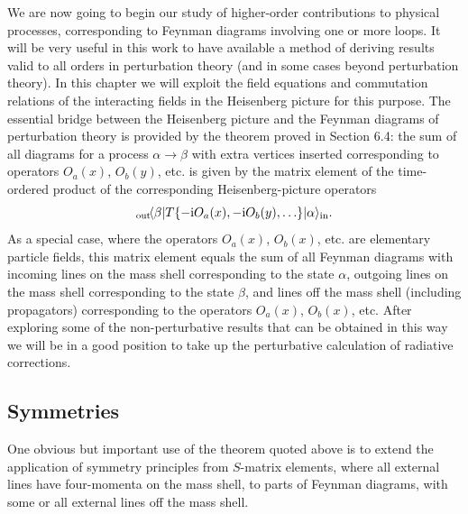 
We are now going to begin our study of higher-order contributions to
physical processes, corresponding to Feynman diagrams involving one or
more loops. It will be very useful in this work to have available a method
of deriving results valid to all orders in perturbation theory (and in some
cases beyond perturbation theory). In this chapter we will exploit the
field equations and commutation relations of the interacting fields in the
Heisenberg picture for this purpose. The essential bridge between the
Heisenberg picture and the Feynman diagrams of perturbation theory is
provided by the theorem proved in Section 6.4: the sum of all diagrams for
a process $\alpha\to\beta$ with extra vertices inserted corresponding to operators
$O_a(x)$, $O_b(y)$, etc. is given by the matrix element of the time-ordered product
of the corresponding Heisenberg-picture operators
\[
  {}_{\mathrm{out}}\!\langle \beta\rvert
  T\{-\mathrm{i} O_a(x),-\mathrm{i} O_b(y),\ldots\}
  \lvert \alpha\rangle_{\mathrm{in}}.
\]
As a special case, where the operators $O_a(x)$, $O_b(x)$, etc. are elementary
particle fields, this matrix element equals the sum of all Feynman diagrams
with incoming lines on the mass shell corresponding to the state $\alpha$,
outgoing lines on the mass shell corresponding to the state $\beta$, and lines
off the mass shell (including propagators) corresponding to the operators
$O_a(x)$, $O_b(x)$, etc. After exploring some of the non-perturbative results
that can be obtained in this way we will be in a good position to take up
the perturbative calculation of radiative corrections.

\subsection{Symmetries}

One obvious but important use of the theorem quoted above is to extend
the application of symmetry principles from $S$-matrix elements, where all
external lines have four-momenta on the mass shell, to parts of Feynman
diagrams, with some or all external lines off the mass shell.

